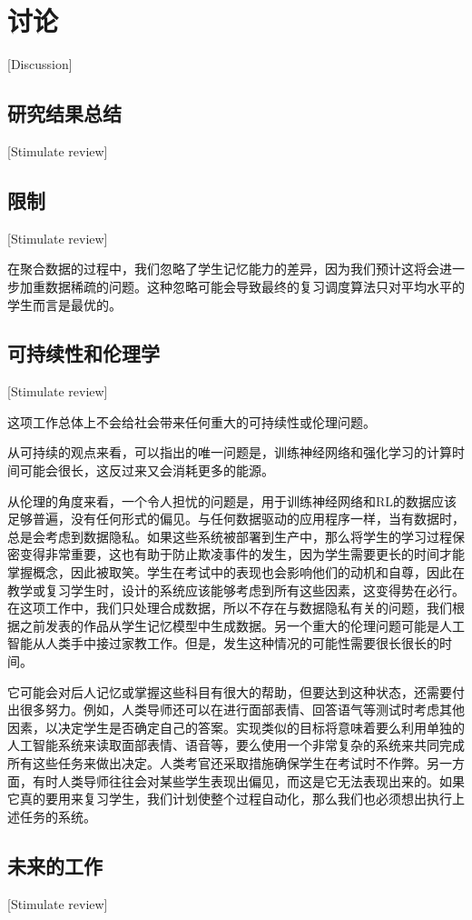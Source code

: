 \chapter[讨论]{讨论}[Discussion]

\section{研究结果总结}[Stimulate review]

\section{限制}[Stimulate review]

在聚合数据的过程中，我们忽略了学生记忆能力的差异，因为我们预计这将会进一步加重数据稀疏的问题。这种忽略可能会导致最终的复习调度算法只对平均水平的学生而言是最优的。

\section{可持续性和伦理学}[Stimulate review]

这项工作总体上不会给社会带来任何重大的可持续性或伦理问题。

从可持续的观点来看，可以指出的唯一问题是，训练神经网络和强化学习的计算时间可能会很长，这反过来又会消耗更多的能源。

从伦理的角度来看，一个令人担忧的问题是，用于训练神经网络和RL的数据应该足够普遍，没有任何形式的偏见。与任何数据驱动的应用程序一样，当有数据时，总是会考虑到数据隐私。如果这些系统被部署到生产中，那么将学生的学习过程保密变得非常重要，这也有助于防止欺凌事件的发生，因为学生需要更长的时间才能掌握概念，因此被取笑。学生在考试中的表现也会影响他们的动机和自尊，因此在教学或复习学生时，设计的系统应该能够考虑到所有这些因素，这变得势在必行。在这项工作中，我们只处理合成数据，所以不存在与数据隐私有关的问题，我们根据之前发表的作品从学生记忆模型中生成数据。另一个重大的伦理问题可能是人工智能从人类手中接过家教工作。但是，发生这种情况的可能性需要很长很长的时间。

它可能会对后人记忆或掌握这些科目有很大的帮助，但要达到这种状态，还需要付出很多努力。例如，人类导师还可以在进行面部表情、回答语气等测试时考虑其他因素，以决定学生是否确定自己的答案。实现类似的目标将意味着要么利用单独的人工智能系统来读取面部表情、语音等，要么使用一个非常复杂的系统来共同完成所有这些任务来做出决定。人类考官还采取措施确保学生在考试时不作弊。另一方面，有时人类导师往往会对某些学生表现出偏见，而这是它无法表现出来的。如果它真的要用来复习学生，我们计划使整个过程自动化，那么我们也必须想出执行上述任务的系统。

\section{未来的工作}[Stimulate review]